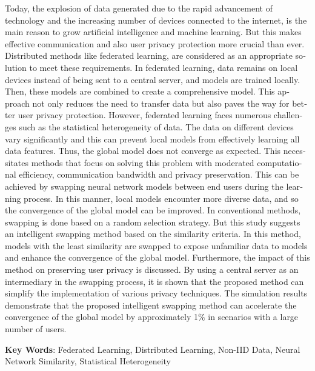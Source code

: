 \begin{latin}
\begin{small}
\baselineskip=0.6cm
Today, the explosion of data generated due to the rapid advancement of technology and the increasing number of devices connected to the internet, is the main reason to grow artificial intelligence and machine learning. But this makes effective communication and also user privacy protection more crucial than ever. Distributed methods like federated learning, are considered as an appropriate solution to meet these requirements. In federated learning, data remains on local devices instead of being sent to a central server, and models are trained locally. Then, these models are combined to create a comprehensive model. This approach not only reduces the need to transfer data but also paves the way for better user privacy protection. However, federated learning faces numerous challenges such as the statistical heterogeneity of data. The data on different devices vary significantly and this can prevent local models from effectively learning all data features. Thus, the global model does not converge as expected. This necessitates methods that focus on solving this problem with moderated computational efficiency, communication bandwidth and privacy preservation. This can be achieved by swapping neural network models between end users during the learning process. In this manner, local models encounter more diverse data, and so the convergence of the global model can be improved. In conventional methods, swapping is done based on a random selection strategy. But this study suggests an intelligent swapping method based on the similarity criteria. In this method, models with the least similarity are swapped to expose unfamiliar data to models and enhance the convergence of the global model. Furthermore, the impact of this method on preserving user privacy is discussed. By using a central server as an intermediary in the swapping process, it is shown that the proposed method can simplify the implementation of various privacy techniques. The simulation results demonstrate that the proposed intelligent swapping method can accelerate the convergence of the global model by approximately 1{\footnotesize \(\%\)} in scenarios with a large number of users.



\end{small}

\vspace{0.5 cm}

\noindent \textbf{Key Words}: Federated Learning, Distributed Learning, Non-IID Data, Neural Network Similarity, Statistical Heterogeneity

\end{latin}